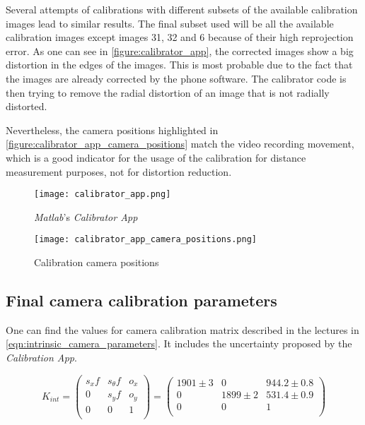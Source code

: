\documentclass[
a4paper,
12pt,
]{article}
\begin{document}
Several attempts of calibrations with different subsets of the available calibration images lead to similar results. The final subset used will be all the available calibration images except images 31, 32 and 6 because of their high reprojection error. As one can see in \autoref{figure:calibrator_app}, the corrected images show a big distortion in the edges of the images. This is most probable due to the fact that the images are already corrected by the phone software. The calibrator code is then trying to remove the radial distortion of an image that is not radially distorted.

Nevertheless, the camera positions highlighted in \autoref{figure:calibrator_app_camera_positions} match the video recording movement, which is a good indicator for the usage of the calibration for distance measurement purposes, not for distortion reduction.

\begin{figure}[h]
\caption{\emph{Matlab}'s \emph{Calibrator App}}
\label{figure:calibrator_app}
\centering
\texttt{[image: calibrator\_app.png]}
\end{figure}

\begin{figure}[h]
\caption{Calibration camera positions}
\label{figure:calibrator_app_camera_positions}
\centering
\texttt{[image: calibrator\_app\_camera\_positions.png]}
\end{figure}

\subsection{Final camera calibration parameters}
\label{subsec:calibration_parameters}

One can find the values for camera calibration matrix described in the lectures in \autoref{eqn:intrinsic_camera_parameters}. It includes the uncertainty proposed by the \emph{Calibration App}.

\begin{equation}
\label{eqn:intrinsic_camera_parameters}
K_{int}=
\begin{pmatrix}
s_x f	& s_{\theta} f	& o_x	\\
0		& s_y f			& o_y	\\
0		& 0				& 1		\\
\end{pmatrix}
=\begin{pmatrix}
1901 \pm 3	& 0				& 944.2 \pm 0.8	\\
0			& 1899 \pm 2	& 531.4 \pm 0.9	\\
0			& 0				& 1		\\
\end{pmatrix}
\end{equation}
\end{document}
